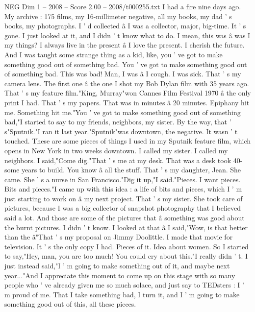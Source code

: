 \begin{textsample}{NEG Dim 1 – 2008 – Score 2.00 – 2008/t000255.txt}  \label{ex:f1_neg_073}
I had a fire nine days ago.
My archive : 175 films, my 16-millimeter negative, all my books, my dad ' s books, my photographs.
I ' d collected â I was a collector, major, big-time.
It ' s gone.
I just looked at it, and I didn ' t know what to do.
I mean, this was â was I my things?
I always live in the present â I love the present.
I cherish the future.
And I was taught some strange thing as a kid, like, you ' ve got to make something good out of something bad.
You ' ve got to make something good out of something bad.
This was bad!
Man, I was â I cough.
I was sick.
That ' s my camera lens.
The first one â the one I shot my Bob Dylan film with 35 years ago.
That ' s my feature film."King, Murray"won Cannes Film Festival 1970 â the only print I had.
That ' s my papers.
That was in minutes â 20 minutes.
Epiphany hit me.
Something hit me."You ' ve got to make something good out of something bad,"I started to say to my friends, neighbors, my sister.
By the way, that ' s"Sputnik."I ran it last year."Sputnik"was downtown, the negative.
It wasn ' t touched.
These are some pieces of things I used in my Sputnik feature film, which opens in New York in two weeks downtown.
I called my sister.
I called my neighbors.
I said,"Come dig."That ' s me at my desk.
That was a desk took 40-some years to build.
You know â all the stuff.
That ' s my daughter, Jean.
She came.
She ' s a nurse in San Francisco."Dig it up,"I said."Pieces.
I want pieces.
Bits and pieces."I came up with this idea : a life of bits and pieces, which I ' m just starting to work on â my next project.
That ' s my sister.
She took care of pictures, because I was a big collector of snapshot photography that I believed said a lot.
And those are some of the pictures that â something was good about the burnt pictures.
I didn ' t know.
I looked at that â I said,"Wow, is that better than the â"That ' s my proposal on Jimmy Doolittle.
I made that movie for television.
It ' s the only copy I had.
Pieces of it.
Idea about women.
So I started to say,"Hey, man, you are too much!
You could cry about this."I really didn ' t.
I just instead said,"I ' m going to make something out of it, and maybe next year..."And I appreciate this moment to come up on this stage with so many people who ' ve already given me so much solace, and just say to TEDsters : I ' m proud of me.
That I take something bad, I turn it, and I ' m going to make something good out of this, all these pieces.

\end{textsample}
